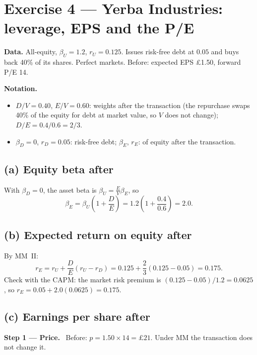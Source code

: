 \documentclass[11pt,a4paper]{article}
\numberwithin{equation}{section}
\newcommand{\step}[2]{\par\medskip\noindent\textbf{Step #1 --- #2.}~}
\newenvironment{notation}{\par\noindent\textbf{Notation.}\begin{itemize}[leftmargin=1.4em]}{\end{itemize}}
\begin{document}
\section{Exercise 4 --- Yerba Industries: leverage, EPS and the P/E}

\noindent\textbf{Data.} All-equity, $\beta_U=1.2$, $r_U=0.125$. Issues risk-free debt at $0.05$ and
buys back 40\% of its shares. Perfect markets. Before: expected EPS \pounds1.50, forward P/E 14.

\begin{notation}
  \item $D/V=0.40$, $E/V=0.60$: weights after the transaction (the repurchase swaps 40\% of the
        equity for debt at market value, so $V$ does not change); $D/E = 0.4/0.6 = 2/3$.
  \item $\beta_D=0$, $r_D=0.05$: risk-free debt; $\beta_E$, $r_E$: of equity after the transaction.
\end{notation}

\subsection*{(a) Equity beta after}

With $\beta_D=0$, the asset beta is $\beta_U = \tfrac{E}{V}\beta_E$, so
\begin{equation}\label{eq:4beta}
  \beta_E = \beta_U\left(1+\frac{D}{E}\right) = 1.2\left(1+\frac{0.4}{0.6}\right) = 2.0 .
\end{equation}

\subsection*{(b) Expected return on equity after}

By MM~II:
\begin{equation}\label{eq:4rE}
  r_E = r_U + \frac{D}{E}(r_U - r_D) = 0.125 + \frac{2}{3}(0.125-0.05) = 0.175 .
\end{equation}
Check with the CAPM: the market risk premium is $(0.125-0.05)/1.2 = 0.0625$, so
$r_E = 0.05 + 2.0(0.0625) = 0.175$.

\subsection*{(c) Earnings per share after}

\step{1}{Price} Before: $p = 1.50\times14 = \pounds21$. Under MM the transaction does not change it.
\end{document}

